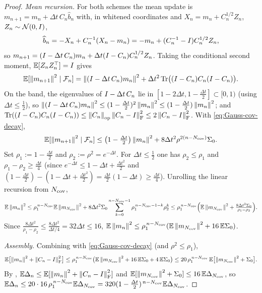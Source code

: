 \begin{proof}
\emph{Mean recursion.} For both schemes the mean update is $m_{n+1}=m_n+\Delta t\,C_n\widehat b_n$
with, in whitened coordinates and $X_n=m_n+C_n^{1/2}Z_n$, $Z_n\sim\mathcal{N}(0,I)$,
\[
    \widehat b_n=-X_n+C_n^{-1}(X_n-m_n)=-m_n+(C_n^{-1}-I)C_n^{1/2}Z_n,
\]
so $m_{n+1}=(I-\Delta t\,C_n)m_n+\Delta t(I-C_n)C_n^{1/2}Z_n$. Taking the conditional
second moment, $\mathbb{E}[Z_nZ_n^\top]=I$ gives
\[
    \mathbb{E}[\left\lVert m_{n+1}\right\rVert^2\mid\mathcal{F}_n]
    =
    \left\lVert (I-\Delta t\,C_n)m_n\right\rVert^2
    +
    \Delta t^2\operatorname{Tr}\bigl((I-C_n)C_n(I-C_n)\bigr).
\]
On the band, the eigenvalues of $I-\Delta t\,C_n$ lie in $[1-2\Delta t,1-\tfrac{\Delta t}2]\subset[0,1)$
(using $\Delta t\leq\tfrac12$), so $\left\lVert (I-\Delta t\,C_n)m_n\right\rVert^2\leq(1-\tfrac{\Delta t}2)^2\left\lVert m_n\right\rVert^2\leq(1-\tfrac{\Delta t}2)\left\lVert m_n\right\rVert^2$;
and $\operatorname{Tr}((I-C_n)C_n(I-C_n))\leq\left\lVert C_n\right\rVert_{\mathrm{op}}\left\lVert C_n-I\right\rVert_{\mathrm{F}}^2\leq2\left\lVert C_n-I\right\rVert_{\mathrm{F}}^2$.
With \eqref{eq:Gauss-cov-decay},
\[
    \mathbb{E}[\left\lVert m_{n+1}\right\rVert^2\mid\mathcal{F}_n]
    \leq
    \bigl(1-\tfrac{\Delta t}2\bigr)\left\lVert m_n\right\rVert^2
    +
    8\Delta t^2\rho^{2(n-N_{\mathrm{cov}})}\Sigma_0 .
\]
Set $\rho_1:=1-\tfrac{\Delta t}2$ and $\rho_2:=\rho^2=e^{-\Delta t}$. For $\Delta t\leq\tfrac12$ one has
$\rho_2\leq\rho_1$ and $\rho_1-\rho_2\geq\tfrac{\Delta t}4$ (since
$e^{-\Delta t}\leq1-\Delta t+\tfrac{\Delta t^2}2$ and $(1-\tfrac{\Delta t}2)-(1-\Delta t+\tfrac{\Delta t^2}2)=\tfrac{\Delta t}2(1-\Delta t)\geq\tfrac{\Delta t}4$).
Unrolling the linear recursion from $N_{\mathrm{cov}}$,
\[
    \mathbb{E}\left\lVert m_n\right\rVert^2
    \leq
    \rho_1^{\,n-N_{\mathrm{cov}}}\mathbb{E}\left\lVert m_{N_{\mathrm{cov}}}\right\rVert^2
    +
    8\Delta t^2\Sigma_0\sum_{k=0}^{n-N_{\mathrm{cov}}-1}\rho_1^{\,n-N_{\mathrm{cov}}-1-k}\rho_2^{k}
    \leq
    \rho_1^{\,n-N_{\mathrm{cov}}}\Bigl(\mathbb{E}\left\lVert m_{N_{\mathrm{cov}}}\right\rVert^2+\tfrac{8\Delta t^2\Sigma_0}{\rho_1-\rho_2}\Bigr).
\]
Since $\tfrac{8\Delta t^2}{\rho_1-\rho_2}\leq\tfrac{8\Delta t^2}{\Delta t/4}=32\Delta t\leq16$,
$\mathbb{E}\left\lVert m_n\right\rVert^2\leq\rho_1^{\,n-N_{\mathrm{cov}}}(\mathbb{E}\left\lVert m_{N_{\mathrm{cov}}}\right\rVert^2+16\,\mathbb{E}\Sigma_0)$.

\emph{Assembly.} Combining with \eqref{eq:Gauss-cov-decay} (and $\rho^2\leq\rho_1$),
\[
    \mathbb{E}\bigl[\left\lVert m_n\right\rVert^2+\left\lVert C_n-I\right\rVert_{\mathrm{F}}^2\bigr]
    \leq
    \rho_1^{\,n-N_{\mathrm{cov}}}\bigl(\mathbb{E}\left\lVert m_{N_{\mathrm{cov}}}\right\rVert^2+16\,\mathbb{E}\Sigma_0+4\,\mathbb{E}\Sigma_0\bigr)
    \leq
    20\,\rho_1^{\,n-N_{\mathrm{cov}}}\,\mathbb{E}\bigl[\left\lVert m_{N_{\mathrm{cov}}}\right\rVert^2+\Sigma_0\bigr].
\]
By , $\mathbb{E}\Delta_n\leq\mathbb{E}[\left\lVert m_n\right\rVert^2+\left\lVert C_n-I\right\rVert_{\mathrm{F}}^2]$ and
$\mathbb{E}[\left\lVert m_{N_{\mathrm{cov}}}\right\rVert^2+\Sigma_0]\leq16\,\mathbb{E}\Delta_{N_{\mathrm{cov}}}$, so
$\mathbb{E}\Delta_n\leq20\cdot16\,\rho_1^{\,n-N_{\mathrm{cov}}}\mathbb{E}\Delta_{N_{\mathrm{cov}}}=320(1-\tfrac{\Delta t}2)^{\,n-N_{\mathrm{cov}}}\mathbb{E}\Delta_{N_{\mathrm{cov}}}$.
\end{proof}


